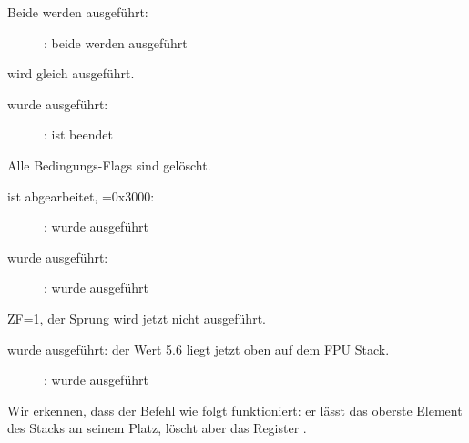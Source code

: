 \clearpage
{}

Beide \FLD werden ausgeführt:

\begin{figure}[H]
\centering
{}
\caption{\olly: beide \FLD werden ausgeführt}
\label{fig:FPU_comparison_Ox_case2_olly1}
\end{figure}

\FCOM wird gleich ausgeführt.

\clearpage
\FCOM wurde ausgeführt:

\begin{figure}[H]
\centering
{}
\caption{\olly: \FCOM ist beendet}
\label{fig:FPU_comparison_Ox_case2_olly2}
\end{figure}

Alle Bedingungs-Flags sind gelöscht.

\clearpage
\FNSTSW ist abgearbeitet, =0x3000:

\begin{figure}[H]
\centering
{}
\caption{\olly: \FNSTSW wurde ausgeführt}
\label{fig:FPU_comparison_Ox_case2_olly3}
\end{figure}

\clearpage
\TEST wurde ausgeführt:

\begin{figure}[H]
\centering
{}
\caption{\olly: \TEST wurde ausgeführt}
\label{fig:FPU_comparison_Ox_case2_olly4}
\end{figure}

ZF=1, der Sprung wird jetzt nicht ausgeführt.

\clearpage
\FSTP {} wurde ausgeführt: der Wert 5.6 liegt jetzt oben auf dem FPU Stack.

\begin{figure}[H]
\centering
{}
\caption{\olly: \FSTP wurde ausgeführt}
\label{fig:FPU_comparison_Ox_case2_olly5}
\end{figure}
Wir erkennen, dass der Befehl \FSTP {} wie folgt funktioniert: er lässt das oberste Element des Stacks an seinem Platz, löscht aber das Register .
